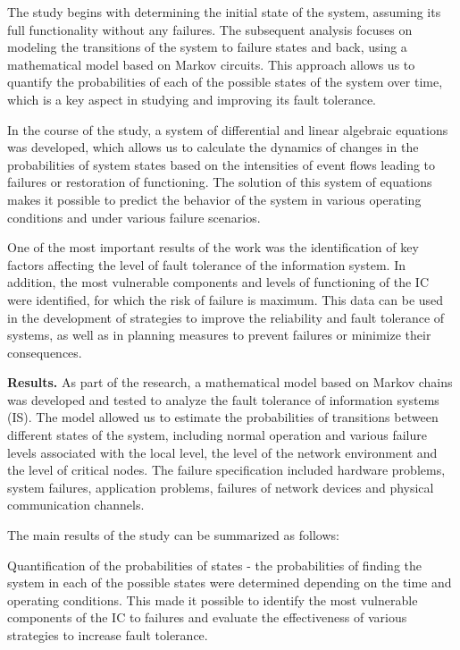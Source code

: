 \begin{multicols}{2}
The study begins with determining the initial state of the system,
assuming its full functionality without any failures. The subsequent
analysis focuses on modeling the transitions of the system to failure
states and back, using a mathematical model based on Markov circuits.
This approach allows us to quantify the probabilities of each of the
possible states of the system over time, which is a key aspect in
studying and improving its fault tolerance.

In the course of the study, a system of differential and linear
algebraic equations was developed, which allows us to calculate the
dynamics of changes in the probabilities of system states based on the
intensities of event flows leading to failures or restoration of
functioning. The solution of this system of equations makes it possible
to predict the behavior of the system in various operating conditions
and under various failure scenarios.

One of the most important results of the work was the identification of
key factors affecting the level of fault tolerance of the information
system. In addition, the most vulnerable components and levels of
functioning of the IC were identified, for which the risk of failure is
maximum. This data can be used in the development of strategies to
improve the reliability and fault tolerance of systems, as well as in
planning measures to prevent failures or minimize their consequences.

{\bfseries Results.} As part of the research, a mathematical model based on
Markov chains was developed and tested to analyze the fault tolerance of
information systems (IS). The model allowed us to estimate the
probabilities of transitions between different states of the system,
including normal operation and various failure levels associated with
the local level, the level of the network environment and the level of
critical nodes. The failure specification included hardware problems,
system failures, application problems, failures of network devices and
physical communication channels.

The main results of the study can be summarized as follows:

Quantification of the probabilities of states - the probabilities of
finding the system in each of the possible states were determined
depending on the time and operating conditions. This made it possible to
identify the most vulnerable components of the IC to failures and
evaluate the effectiveness of various strategies to increase fault
tolerance.


\end{multicols}
